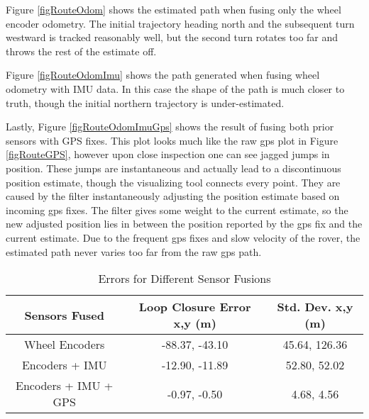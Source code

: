 Figure \ref{figRouteOdom} shows the estimated path when fusing only the wheel encoder odometry. The initial trajectory heading north and the subsequent turn westward is tracked reasonably well, but the second turn rotates too far and throws the rest of the estimate off.

Figure \ref{figRouteOdomImu} shows the path generated when fusing wheel odometry with IMU data. In this case the shape of the path is much closer to truth, though the initial northern trajectory is under-estimated.




Lastly, Figure \ref{figRouteOdomImuGps} shows the result of fusing both prior sensors with GPS fixes. This plot looks much like the raw gps plot in Figure \ref{figRouteGPS}, however upon close inspection one can see jagged jumps in position. These jumps are instantaneous and actually lead to a discontinuous position estimate, though the visualizing tool connects every point. They are caused by the filter instantaneously adjusting the position estimate based on incoming gps fixes. The filter gives some weight to the current estimate, so the new adjusted position lies in between the position reported by the gps fix and the current estimate. Due to the frequent gps fixes and slow velocity of the rover, the estimated path never varies too far from the raw gps path.

\begin{table}[h]
	\caption {Errors for Different Sensor Fusions \cite{robot_localization_paper}} \label{tab:errors} 
	\begin{center}
		\begin{tabular}{|c|c|c|} \hline
			\textbf{Sensors Fused} & \textbf{Loop Closure Error x,y (m)} & \textbf{Std. Dev. x,y (m)} \\ \hline
			Wheel Encoders & -88.37, -43.10 & 45.64, 126.36 \\ \hline
			Encoders + IMU & -12.90, -11.89 & 52.80,  52.02 \\ \hline
			Encoders + IMU + GPS & -0.97, -0.50 & 4.68,  4.56 \\ \hline
		\end{tabular}
	\end{center}
\end{table}

